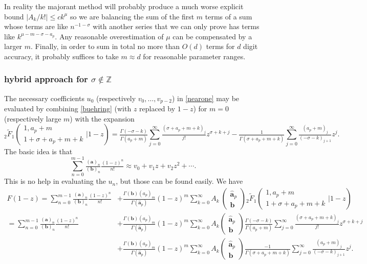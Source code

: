\documentclass[12pt]{article}
\numberwithin{equation}{section}
\newcommand{\Head}[3] {{}_{#1}{#2}_{#3}}
\newcommand{\ArgS}[3] {( \begin{smallmatrix} #1 \\ #2 \end{smallmatrix} | {#3})}
\newcommand{\ParamS}[2] {( \begin{smallmatrix} #1 \\ #2 \end{smallmatrix})}
\begin{document}
In reality the majorant method will probably produce a much worse explicit bound $|A_k/k!| \le c k^{\mu}$ so we are balancing the sum of the first $m$ terms of a sum whose terms are like $n^{-1-\sigma}$ with another series that we can only prove has terms like $k^{\mu-m-\sigma-a_p}$. Any reasonable overestimation of $\mu$ can be compensated by a larger $m$. Finally, in order to sum in total no more than $O(d)$ terms for $d$ digit accuracy, it probably suffices to take $m \approx d$ for reasonable parameter ranges.

\subsubsection{hybrid approach for $\sigma \not \in \mathbb{Z}$}
The necessary coefficients $u_0$ (respectively $v_0,\dots,v_{p-2}$) in \eqref{nearone} may be evaluated by combining \eqref{buehring} (with $z$ replaced by $1-z$) for $m=0$ (respectively large $m$) with the expansion
\begin{equation}
\label{2f1nearone}
\Head{2}{\tilde{F}}{1} \ArgS{1,a_p+m}{1+\sigma+a_p+m+k}{1-z} = \tfrac{\Gamma (-\sigma-k)}{\Gamma (a_p+m)} \sum_{j=0}^{\infty} \tfrac{(\sigma+a_p+m+k)_j}{j!}z^{\sigma+k+j}-\tfrac{1}{\Gamma(\sigma+a_p+m+k)} \sum_{j=0}^{\infty} \tfrac{(a_p+m)_j}{(-\sigma-k)_{j+1}} z^j\text{.}
\end{equation}
The basic idea is that
\begin{equation}
\label{viapprox}
\sum_{n=0}^{m-1} \tfrac{(\mathbf a)_n}{(\mathbf b)_n}\tfrac{(1-z)^n}{n!} \approx v_0 + v_1 z + v_2 z^2 + \cdots\text{.}
\end{equation}
This is no help in evaluating the $u_n$, but those can be found easily. We have
\begin{align*}
F(1-z)=\sum_{n=0}^{m-1} \tfrac{(\mathbf a)_n}{(\mathbf b)_n}\tfrac{(1-z)^n}{n!}&+\tfrac{\Gamma(\mathbf{b})(a_p)_m}{\Gamma(\hat{\mathbf{a}}_p)} (1-z)^m \sum_{k=0}^{\infty} A_k\ \ParamS{\hat{\mathbf{a}}_p}{\mathbf{b}} \Head{2}{\tilde{F}}{1} \ArgS{1,a_p+m}{1+\sigma+a_p+m+k}{1-z}\\
=\sum_{n=0}^{m-1} \tfrac{(\mathbf a)_n}{(\mathbf b)_n}\tfrac{(1-z)^n}{n!}&+\tfrac{\Gamma(\mathbf{b})(a_p)_m}{\Gamma(\hat{\mathbf{a}}_p)} (1-z)^m \sum_{k=0}^{\infty} {A_k \ParamS{\hat{\mathbf{a}}_p}{\mathbf{b}}} \tfrac{\Gamma (-\sigma-k)}{\Gamma (a_p+m)} \sum_{j=0}^{\infty} \tfrac{(\sigma+a_p+m+k)_j}{j!}z^{\sigma+k+j}\\
&+\tfrac{\Gamma(\mathbf{b})(a_p)_m}{\Gamma(\hat{\mathbf{a}}_p)} (1-z)^m \sum_{k=0}^{\infty} {A_k \ParamS{\hat{\mathbf{a}}_p}{\mathbf{b}}} \tfrac{-1}{\Gamma
	(\sigma+a_p+m+k)} \sum_{j=0}^{\infty} \tfrac{(a_p+m)_j}{(-\sigma-k)_{j+1}} z^j.
\end{align*}
\end{document}
